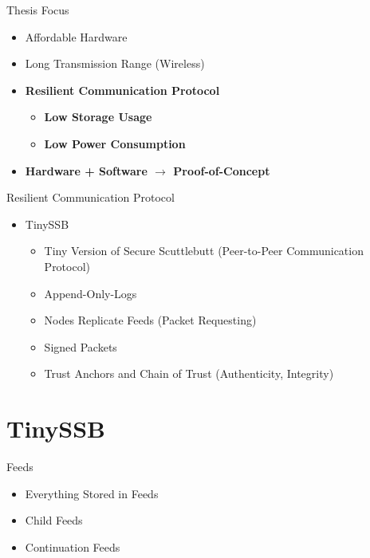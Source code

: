 \documentclass[aspectratio=169]{beamer}
\begin{document}
\begin{frame}[c]{Thesis Focus}
\begin{itemize}
    \item Affordable Hardware
    \item Long Transmission Range (Wireless)
    \item \textbf{Resilient Communication Protocol}
    \begin{itemize}
    	\item \textbf{Low Storage Usage}
	\item \textbf{Low Power Consumption}
    \end{itemize}
    \item \textbf{Hardware + Software $\rightarrow$ Proof-of-Concept}
\end{itemize}        
\end{frame}

\begin{frame}[c]{Resilient Communication Protocol}
\begin{itemize}
    \item TinySSB
    	\begin{itemize}
	    \item Tiny Version of Secure Scuttlebutt (Peer-to-Peer Communication Protocol) 
    	    \item Append-Only-Logs
	    \item Nodes Replicate Feeds (Packet Requesting)
	    \item Signed Packets
	    \item Trust Anchors and Chain of Trust (Authenticity, Integrity)
	\end{itemize}
\end{itemize}        
\end{frame}

\section{TinySSB}

\begin{frame}[c]{Feeds}
\begin{itemize}
    \item Everything Stored in Feeds
    \item Child Feeds
    \item Continuation Feeds
    
\end{itemize}        
\end{frame}
\end{document}
